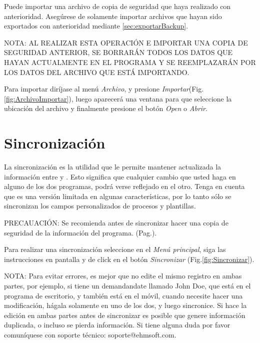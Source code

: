 Puede importar una archivo de copia de seguridad que haya realizado con anterioridad. Aseg\'urese de solamente importar archivos que hayan sido exportados con anterioridad mediante \ref{sec:exportarBackup}.

NOTA: AL REALIZAR ESTA OPERACI\'ON E IMPORTAR UNA COPIA DE SEGURIDAD ANTERIOR, SE BORRAR\'AN TODOS LOS DATOS QUE HAYAN ACTUALMENTE EN EL PROGRAMA Y SE REEMPLAZAR\'AN POR LOS DATOS DEL ARCHIVO QUE EST\'A IMPORTANDO.

Para importar dir\'ijase al men\'u \emph{Archivo}, y presione \emph{Importar}(Fig.\ref{fig:ArchivoImportar}), luego aparecer\'a una ventana para que seleccione la ubicaci\'on del archivo y finalmente presione el bot\'on \emph{Open} o \emph{Abrir}.


\section{Sincronizaci\'on}

La sincronizaci\'on es la utilidad que le permite mantener actualizada la informaci\'on entre \softwareAbogadosDesktop y \softwareAbogadosMobile. Esto significa que cualquier cambio que usted haga en alguno de los dos programas, podr\'a verse reflejado en el otro. Tenga en cuenta que \softwareAbogadosMobile es una versi\'on limitada en algunas caracter\'isticas, por lo tanto s\'olo se sincronizan los campos personalizados de procesos y plantillas.

PRECAUACI\'ON: Se recomienda antes de sincronizar hacer una copia de seguridad de la informaci\'on del programa. (Pag.\pageref{sec:exportarBackup}).

Para realizar una sincronizaci\'on seleccione en el \emph{Men\'u principal}, siga las instrucciones en pantalla y de click en el bot\'on \emph{Sincronizar} (Fig.\ref{fig:Sincronizar}). 
  

NOTA: Para evitar errores, es mejor que no edite el mismo registro en ambas partes, por ejemplo, si tiene un demandandate llamado John Doe, que est\'a en el programa de escritorio, y tambi\'en est\'a en el m\'ovil, cuando necesite hacer una modificaci\'on, h\'agala solamente en uno de los dos, y luego sincronice. Si hace la edici\'on en ambas partes antes de sincronizar es posible que genere informaci\'on duplicada, o incluso se pierda informaci\'on. Si tiene alguna duda por favor comun\'iquese con soporte t\'ecnico: \mbox{soporte@ehmsoft.com}.

